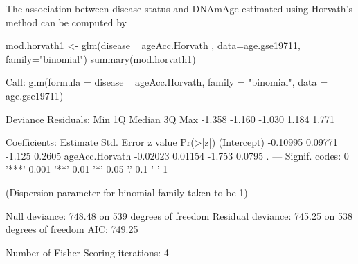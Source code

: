 \documentclass[]{article}
\newcommand{\hlnum}[1]{\textcolor[rgb]{0.816,0.125,0.439}{#1}}%
\newcommand{\hlstr}[1]{\textcolor[rgb]{0.251,0.627,0.251}{#1}}%
\newcommand{\hlopt}[1]{\textcolor[rgb]{0,0,0}{#1}}%
\newcommand{\hlstd}[1]{\textcolor[rgb]{0.251,0.251,0.251}{#1}}%
\newcommand{\hlkwc}[1]{\textcolor[rgb]{0.251,0.251,0.251}{#1}}%
\newcommand{\hlkwd}[1]{\textcolor[rgb]{0.878,0.439,0.125}{#1}}%
\newenvironment{Shaded}{\begin{myshaded}}{\end{myshaded}}
\newcommand{\KeywordTok}[1]{\hlkwd{#1}}
\newcommand{\DataTypeTok}[1]{\hlkwc{#1}}
\newcommand{\DecValTok}[1]{\hlnum{#1}}
\newcommand{\FloatTok}[1]{\hlnum{#1}}
\newcommand{\StringTok}[1]{\hlstr{#1}}
\newcommand{\ControlFlowTok}[1]{\hlkwd{#1}}
\newcommand{\OperatorTok}[1]{\hlopt{#1}}
\newcommand{\ErrorTok}[1]{\textcolor{errorcolor}{#1}}
\newcommand{\NormalTok}[1]{\hlstd{#1}}
\begin{document}
The association between disease status and DNAmAge estimated using Horvath's method can be computed by

\begin{Shaded}
\begin{Highlighting}[]
\NormalTok{mod.horvath1 <-}\StringTok{ }\KeywordTok{glm}\NormalTok{(disease }\OperatorTok{~}\StringTok{ }\NormalTok{ageAcc.Horvath , }
                   \DataTypeTok{data=}\NormalTok{age.gse19711,}
                   \DataTypeTok{family=}\StringTok{"binomial"}\NormalTok{)}
\KeywordTok{summary}\NormalTok{(mod.horvath1)}
  
\NormalTok{  Call}\OperatorTok{:}
\StringTok{  }\KeywordTok{glm}\NormalTok{(}\DataTypeTok{formula =}\NormalTok{ disease }\OperatorTok{~}\StringTok{ }\NormalTok{ageAcc.Horvath, }\DataTypeTok{family =} \StringTok{"binomial"}\NormalTok{, }
      \DataTypeTok{data =}\NormalTok{ age.gse19711)}
  
\NormalTok{  Deviance Residuals}\OperatorTok{:}\StringTok{ }
\StringTok{     }\NormalTok{Min      1Q  Median      3Q     Max  }
  \FloatTok{-1.358}  \FloatTok{-1.160}  \FloatTok{-1.030}   \FloatTok{1.184}   \FloatTok{1.771}  
  
\NormalTok{  Coefficients}\OperatorTok{:}
\StringTok{                 }\NormalTok{Estimate Std. Error z value }\KeywordTok{Pr}\NormalTok{(}\OperatorTok{>}\ErrorTok{|}\NormalTok{z}\OperatorTok{|}\NormalTok{)  }
\NormalTok{  (Intercept)    }\FloatTok{-0.10995}    \FloatTok{0.09771}  \FloatTok{-1.125}   \FloatTok{0.2605}  
\NormalTok{  ageAcc.Horvath }\FloatTok{-0.02023}    \FloatTok{0.01154}  \FloatTok{-1.753}   \FloatTok{0.0795}\NormalTok{ .}
  \OperatorTok{---}
\StringTok{  }\NormalTok{Signif. codes}\OperatorTok{:}\StringTok{  }\DecValTok{0} \StringTok{'***'} \FloatTok{0.001} \StringTok{'**'} \FloatTok{0.01} \StringTok{'*'} \FloatTok{0.05} \StringTok{'.'} \FloatTok{0.1} \StringTok{' '} \DecValTok{1}
  
\NormalTok{  (Dispersion parameter }\ControlFlowTok{for}\NormalTok{ binomial family taken to be }\DecValTok{1}\NormalTok{)}
  
\NormalTok{      Null deviance}\OperatorTok{:}\StringTok{ }\FloatTok{748.48}\NormalTok{  on }\DecValTok{539}\NormalTok{  degrees of freedom}
\NormalTok{  Residual deviance}\OperatorTok{:}\StringTok{ }\FloatTok{745.25}\NormalTok{  on }\DecValTok{538}\NormalTok{  degrees of freedom}
\NormalTok{  AIC}\OperatorTok{:}\StringTok{ }\FloatTok{749.25}
  
\NormalTok{  Number of Fisher Scoring iterations}\OperatorTok{:}\StringTok{ }\DecValTok{4}


\end{Highlighting}
\end{Shaded}
\end{document}

